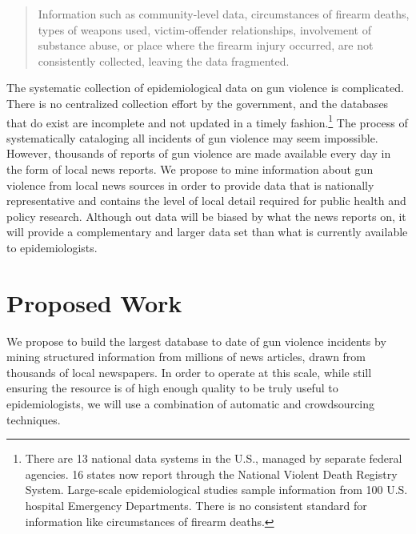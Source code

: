 \documentclass[11pt]{article}
\begin{document}
\begin{quote}
Information such as community-level data, circumstances of firearm deaths, types of weapons used, victim-offender relationships, involvement of substance abuse, or place where the firearm injury occurred, are not consistently collected, leaving the data fragmented. \cite{ficapresourcebook} 
\end{quote}

The systematic collection of epidemiological data on gun violence is complicated.  There is no centralized collection effort by the government, and the databases that do exist are incomplete and not updated in a timely fashion.\footnote{
There are 13 national data systems in the U.S., managed by separate federal agencies. 16 states now report through the National Violent Death Registry System.  Large-scale epidemiological studies sample information from 100 U.S. hospital Emergency Departments.   There is no consistent standard for information like circumstances of firearm deaths.
}
The process of systematically cataloging all incidents of gun violence may seem impossible.  However, thousands of reports of gun violence are made available every day in the form of local news reports.  We propose to mine information about gun violence from local news sources in order to provide data that is nationally representative  and contains the level of local detail required for public health and policy research.  Although out data will be biased by what the news reports on, it will provide a complementary and larger data set than what is currently available to epidemiologists.

\section{Proposed Work}

We propose to build the largest database to date of gun violence incidents by mining structured information from millions of news articles, drawn from thousands of local newspapers. In order to operate at this scale, while still ensuring the resource is of high enough quality to be truly useful to epidemiologists, we will use a combination of automatic and crowdsourcing techniques. 
\end{document}
